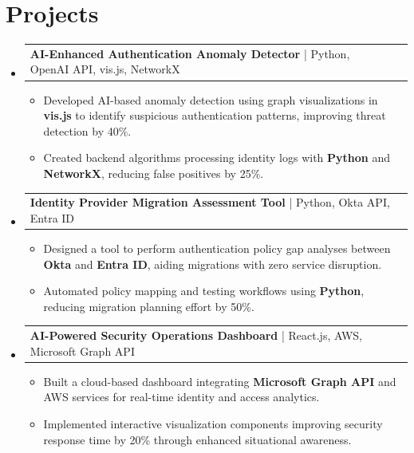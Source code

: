 \documentclass[letterpaper,11pt]{article}
\makeatletter
\newcommand{\resumeItem}[1]{
  \item\footnotesize{
    {#1 \vspace{-2pt}}
  }
}
\newcommand{\resumeProjectHeading}[2]{
    \item
    \begin{tabular*}{1.001\textwidth}{l@{\extracolsep{\fill}}r}
      \small#1 & \textbf{\small #2}\\
    \end{tabular*}\vspace{-7pt}
}
\newcommand{\resumeSubHeadingListStart}{\begin{itemize}[leftmargin=0pt, label={}]}
\newcommand{\resumeSubHeadingListEnd}{\end{itemize}}
\newcommand{\resumeItemListStart}{\begin{itemize}[leftmargin=*]}
\newcommand{\resumeItemListEnd}{\end{itemize}\vspace{-5pt}}
\makeatother
\begin{document}
\section{Projects}
    \vspace{-5pt}
    \resumeSubHeadingListStart
          \resumeProjectHeading
              {\textbf{AI-Enhanced Authentication Anomaly Detector} | Python, OpenAI API, vis.js, NetworkX}{}
        \resumeItemListStart
            \resumeItem{Developed AI-based anomaly detection using graph visualizations in \textbf{vis.js} to identify suspicious authentication patterns, improving threat detection by 40\%.}
            \resumeItem{Created backend algorithms processing identity logs with \textbf{Python} and \textbf{NetworkX}, reducing false positives by 25\%.}
        \resumeItemListEnd
        \vspace{-12pt}
    
    \resumeProjectHeading
        {\textbf{Identity Provider Migration Assessment Tool} | Python, Okta API, Entra ID}{}
        \resumeItemListStart
            \resumeItem{Designed a tool to perform authentication policy gap analyses between \textbf{Okta} and \textbf{Entra ID}, aiding migrations with zero service disruption.}
            \resumeItem{Automated policy mapping and testing workflows using \textbf{Python}, reducing migration planning effort by 50\%.}
        \resumeItemListEnd
          \vspace{-12pt}
      \resumeProjectHeading
          {\textbf{AI-Powered Security Operations Dashboard} | React.js, AWS, Microsoft Graph API}{}
          \resumeItemListStart
              \resumeItem{Built a cloud-based dashboard integrating \textbf{Microsoft Graph API} and AWS services for real-time identity and access analytics.}
              \resumeItem{Implemented interactive visualization components improving security response time by 20\% through enhanced situational awareness.}
          \resumeItemListEnd 
    \resumeSubHeadingListEnd
\end{document}
